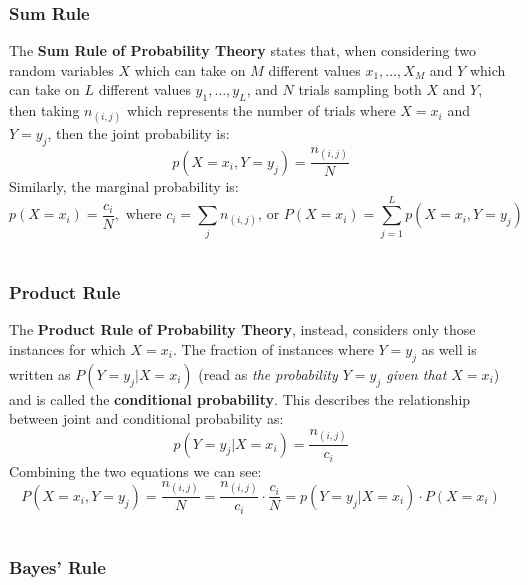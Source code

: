 \documentclass[11pt]{article} %
\begin{document}
\subsubsection{Sum Rule}

The {\bf Sum Rule of Probability Theory} states that, when considering two random variables $X$ which can take on $M$ different values $x_1,\ldots,X_M$ and $Y$ which can take on $L$ different values $y_1,\ldots,y_L$, and $N$ trials sampling both $X$ and $Y$, then taking $n_{(i,j)}$ which represents the number of trials where $X = x_i$ and $Y = y_j$, then the joint probability is:
\begin{equation}
p(X=x_i,Y=y_j) = \frac{n_{(i,j)}}{N}
\end{equation}
Similarly, the marginal probability is:
\begin{equation}
p(X=x_i) = \frac{c_i}{N},\text{ where } c_i = \sum_{j} n_{(i,j)}\text{, or } P(X=x_i) = \sum_{j=1}^{L} p(X=x_i,Y=y_j)
\end{equation}
~\\
\subsubsection{Product Rule}
The {\bf Product Rule of Probability Theory}, instead, considers only those instances for which $X=x_i$. The fraction of instances where $Y=y_j$ as well is written as $P(Y=y_j|X=x_i)$ (read as {\em the probability $Y=y_j$ given that $X = x_i$}) and is called the {\bf conditional probability}. This describes the relationship between joint and conditional probability as:
\begin{equation}
p(Y=y_j | X=x_i) = \frac{n_{(i,j)}}{c_i}
\end{equation}
Combining the two equations we can see:
\begin{equation}
P(X=x_i,Y=y_j) = \frac{n_{(i,j)}}{N} = \frac{n_{(i,j)}}{c_i} \cdot \frac{c_i}{N} = p(Y=y_j | X=x_i) \cdot P(X=x_i)
\end{equation}
~\\
\subsubsection{Bayes' Rule}
\end{document}
